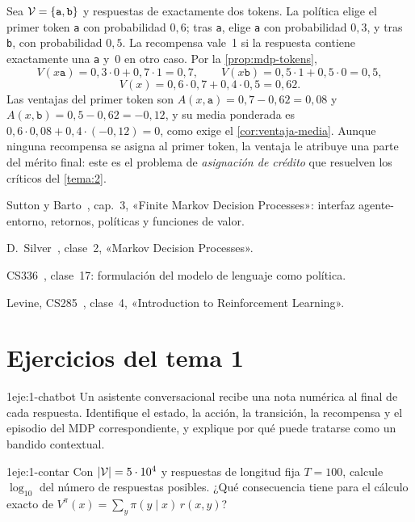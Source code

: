 \begin{ejemplo}\label{ej:arbol}
Sea $\mathcal{V}=\{\texttt{a},\texttt{b}\}$ y respuestas de exactamente dos tokens. La política elige el primer token \texttt{a} con probabilidad $0{,}6$; tras \texttt{a}, elige \texttt{a} con probabilidad $0{,}3$, y tras \texttt{b}, con probabilidad $0{,}5$. La recompensa vale~1 si la respuesta contiene exactamente una \texttt{a} y~0 en otro caso. Por la \cref{prop:mdp-tokens},
\[
V(x\texttt{a})=0{,}3\cdot 0+0{,}7\cdot 1=0{,}7,\qquad V(x\texttt{b})=0{,}5\cdot 1+0{,}5\cdot 0=0{,}5,
\]
\[
V(x)=0{,}6\cdot 0{,}7+0{,}4\cdot 0{,}5=0{,}62.
\]
Las ventajas del primer token son $A(x,\texttt{a})=0{,}7-0{,}62=0{,}08$ y $A(x,\texttt{b})=0{,}5-0{,}62=-0{,}12$, y su media ponderada es $0{,}6\cdot 0{,}08+0{,}4\cdot(-0{,}12)=0$, como exige el \cref{cor:ventaja-media}. Aunque ninguna recompensa se asigna al primer token, la ventaja le atribuye una parte del mérito final: este es el problema de \emph{asignación de crédito} que resuelven los críticos del \cref{tema:2}.
\end{ejemplo}

\begin{lecturas}
\item Sutton y Barto~\cite{sb}, cap.~3, «Finite Markov Decision Processes»: interfaz agente-entorno, retornos, políticas y funciones de valor.
\item D.~Silver~\cite{silver}, clase~2, «Markov Decision Processes».
\item CS336~\cite{cs336}, clase~17: formulación del modelo de lenguaje como política.
\item Levine, CS285~\cite{cs285}, clase~4, «Introduction to Reinforcement Learning».
\end{lecturas}

\section*{Ejercicios del tema 1}

\begin{ejercicio}{1}{eje:1-chatbot}
Un asistente conversacional recibe una nota numérica al final de cada respuesta. Identifique el estado, la acción, la transición, la recompensa y el episodio del MDP correspondiente, y explique por qué puede tratarse como un bandido contextual.
\end{ejercicio}

\begin{ejercicio}{1}{eje:1-contar}
Con $\lvert\mathcal{V}\rvert=5\cdot 10^{4}$ y respuestas de longitud fija $T=100$, calcule $\log_{10}$ del número de respuestas posibles. ¿Qué consecuencia tiene para el cálculo exacto de $V^{\pi}(x)=\sum_y\pi(y\mid x)\,r(x,y)$?
\end{ejercicio}

